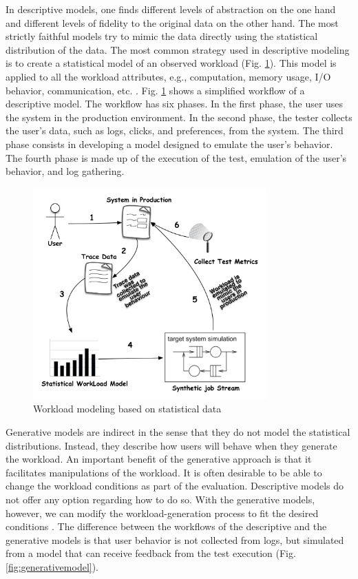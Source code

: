 In descriptive models, one finds different levels of abstraction on the one hand and different levels of fidelity to the original data on the other hand. The most strictly faithful models try to mimic the data directly using the statistical distribution of the data. The most common strategy used in descriptive modeling is to create a statistical model of an observed workload (Fig. \ref{fig:descriptivemodel}). This model is applied to all the workload attributes, e.g., computation, memory usage, I/O behavior, communication, etc. \cite{DiLucca2006}. Fig. \ref{fig:descriptivemodel} shows a simplified workflow of a descriptive model. The workflow has six phases. In the first phase, the user uses the system in the production environment. In the second phase, the tester collects the user's data, such as logs, clicks, and preferences, from the system. The third phase consists in developing a model designed to emulate the user's behavior. The fourth phase is made up of the execution of the test, emulation of the user's behavior, and log gathering.



\begin{figure}[!ht]

\centering
\includegraphics[width=0.8\textwidth]{./images/workloadmodel1300dpi.png}
\caption{Workload modeling based on statistical data \cite{DiLucca2006}}
\label{fig:descriptivemodel}
\end{figure}


Generative models are indirect in the sense that they do not model the statistical distributions. Instead, they describe how users will behave when they generate the workload. An important benefit of the generative approach is that it facilitates manipulations of the workload. It is often desirable to be able to change the workload conditions as part of the evaluation. Descriptive models do not offer any option regarding how to do so. With the generative models, however, we can modify the workload-generation process to fit the desired conditions \cite{DiLucca2006}. The difference between the workflows of the descriptive and the generative models is that user behavior is not collected from logs, but simulated from a model that can receive feedback from the test execution (Fig. \ref{fig:generativemodel}).


